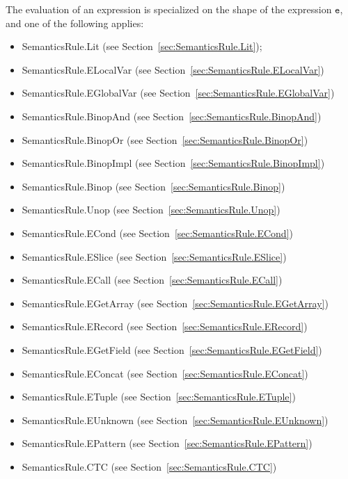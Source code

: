 \documentclass{book}
\newcommand\ve[0]{\texttt{e}}
\begin{document}
The evaluation of an expression is specialized on the shape of the expression $\ve$,
and one of the following applies:
\begin{itemize}
\item SemanticsRule.Lit (see Section~\ref{sec:SemanticsRule.Lit});
\item SemanticsRule.ELocalVar (see Section~\ref{sec:SemanticsRule.ELocalVar})
\item SemanticsRule.EGlobalVar (see Section~\ref{sec:SemanticsRule.EGlobalVar})
\item SemanticsRule.BinopAnd (see Section~\ref{sec:SemanticsRule.BinopAnd})
\item SemanticsRule.BinopOr (see Section~\ref{sec:SemanticsRule.BinopOr})
\item SemanticsRule.BinopImpl (see Section~\ref{sec:SemanticsRule.BinopImpl})
\item SemanticsRule.Binop (see Section~\ref{sec:SemanticsRule.Binop})
\item SemanticsRule.Unop (see Section~\ref{sec:SemanticsRule.Unop})
\item SemanticsRule.ECond (see Section~\ref{sec:SemanticsRule.ECond})
\item SemanticsRule.ESlice (see Section~\ref{sec:SemanticsRule.ESlice})
\item SemanticsRule.ECall (see Section~\ref{sec:SemanticsRule.ECall})
\item SemanticsRule.EGetArray (see Section~\ref{sec:SemanticsRule.EGetArray})
\item SemanticsRule.ERecord (see Section~\ref{sec:SemanticsRule.ERecord})
\item SemanticsRule.EGetField (see Section~\ref{sec:SemanticsRule.EGetField})
\item SemanticsRule.EConcat (see Section~\ref{sec:SemanticsRule.EConcat})
\item SemanticsRule.ETuple (see Section~\ref{sec:SemanticsRule.ETuple})
\item SemanticsRule.EUnknown (see Section~\ref{sec:SemanticsRule.EUnknown})
\item SemanticsRule.EPattern (see Section~\ref{sec:SemanticsRule.EPattern})
\item SemanticsRule.CTC (see Section~\ref{sec:SemanticsRule.CTC})
\end{itemize}
\end{document}
